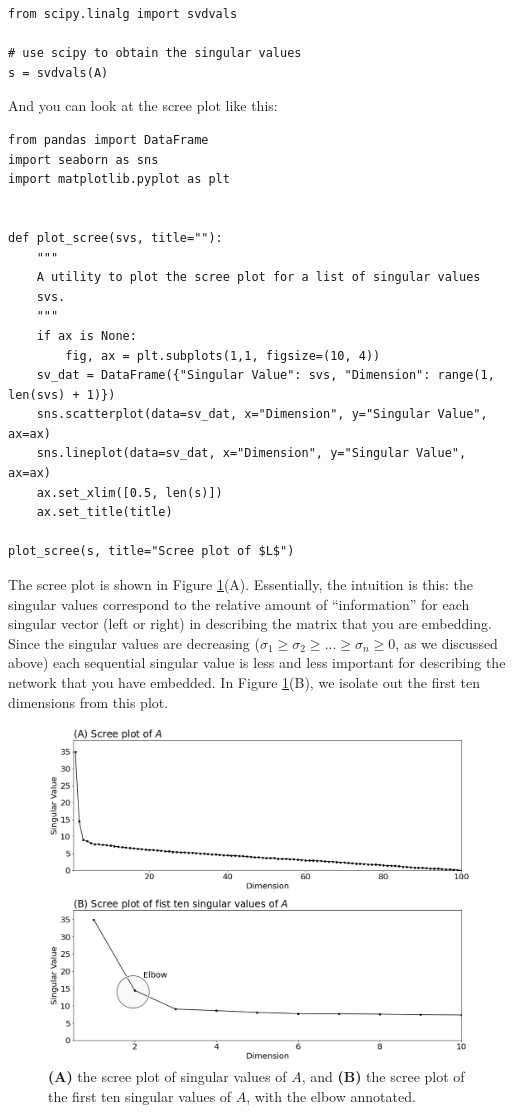 \begin{lstlisting}[style=python]
from scipy.linalg import svdvals

# use scipy to obtain the singular values
s = svdvals(A)
\end{lstlisting}

And you can look at the scree plot like this:

\begin{lstlisting}[style=python]
from pandas import DataFrame
import seaborn as sns
import matplotlib.pyplot as plt


def plot_scree(svs, title=""):
    """
    A utility to plot the scree plot for a list of singular values
    svs.
    """
    if ax is None:
        fig, ax = plt.subplots(1,1, figsize=(10, 4))
    sv_dat = DataFrame({"Singular Value": svs, "Dimension": range(1, len(svs) + 1)})
    sns.scatterplot(data=sv_dat, x="Dimension", y="Singular Value", ax=ax)
    sns.lineplot(data=sv_dat, x="Dimension", y="Singular Value", ax=ax)
    ax.set_xlim([0.5, len(s)])
    ax.set_title(title)

plot_scree(s, title="Scree plot of $L$")
\end{lstlisting}

The scree plot is shown in Figure \ref{fig:ch6:scree}(A). Essentially, the intuition is this: the singular values correspond to the relative amount of ``information'' for each singular vector (left or right) in describing the matrix that you are embedding. Since the singular values are decreasing ($\sigma_1 \geq \sigma_2 \geq ... \geq \sigma_n \geq 0$, as we discussed above) each sequential singular value is less and less important for describing the network that you have embedded. In Figure \ref{fig:ch6:scree}(B), we isolate out the first ten dimensions from this plot.

\begin{figure}[h]
    \centering
    \includegraphics[width=\linewidth]{representations/ch6/Images/scree.png}
    \caption[Scree plot of an adjacency spectral embedding]{\textbf{(A)} the scree plot of singular values of $A$, and \textbf{(B)} the scree plot of the first ten singular values of $A$, with the elbow annotated.}
    \label{fig:ch6:scree}
\end{figure}

